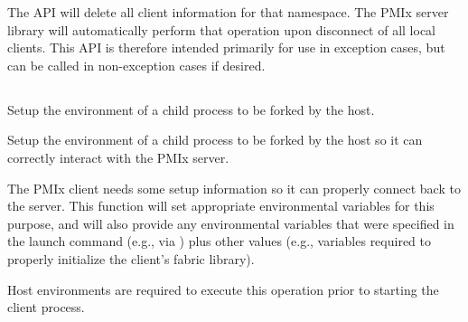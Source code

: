 \descr

The  \ac{API} will delete all client information for that namespace. The \ac{PMIx} server library will automatically perform that operation upon disconnect of all local clients.
This \ac{API} is therefore intended primarily for use in exception cases, but can be called in non-exception cases if desired.


\subsection{}

\summary

Setup the environment of a child process to be forked by the host.

\format


\begin{arglist}
\end{arglist}

\returnsimple

\descr

Setup the environment of a child process to be forked by the host so it can correctly interact with the PMIx server.

The \ac{PMIx} client needs some setup information so it can properly connect back to the server.
This function will set appropriate environmental variables for this purpose, and will also provide any environmental variables that were specified in the launch command (e.g., via ) plus other values (e.g., variables required to properly initialize the client's fabric library).

\advicermstart
Host environments are required to execute this operation prior to starting the client process.
\advicermend


\subsection{}

